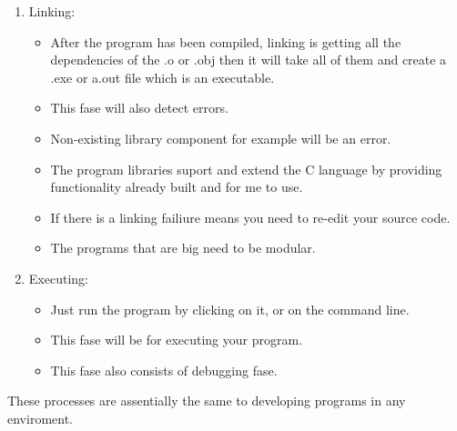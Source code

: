 \begin{enumerate}
    \item Linking: 
        \begin{itemize}
            \item After the program has been compiled, linking is getting all the dependencies of the .o or .obj then it will take all of them and create a .exe or a.out file which is an executable.
            \item This fase will also detect errors.
            \item Non-existing library component for example will be an error.
            \item The program libraries suport and extend the C language by providing functionality already built and for me to use.
            \item If there is a linking failiure means you need to re-edit your source code.
            \item The programs that are big need to be modular.
        \end{itemize}

    \item Executing:
        \begin{itemize}
            \item Just run the program by clicking on it, or on the command line.
            \item This fase will be for executing your program.
            \item This fase also consists of debugging fase.
        \end{itemize}
\end{enumerate}

These processes are assentially the same to developing programs in any enviroment. 
